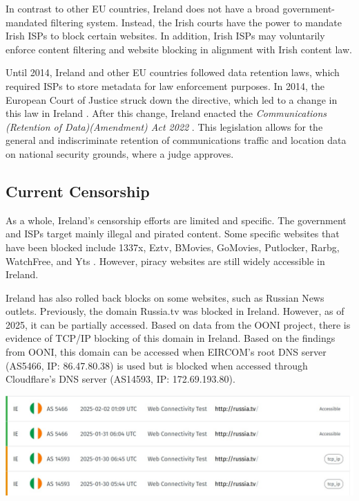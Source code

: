 In contrast to other EU countries, Ireland does not have a broad government-mandated filtering system. Instead, the Irish courts have the power to mandate Irish ISPs to block certain websites. In addition, Irish ISPs may voluntarily enforce content filtering and website blocking in alignment with Irish content law.

Until 2014, Ireland and other EU countries followed data retention laws, which required ISPs to store metadata for law enforcement purposes. In 2014, the European Court of Justice struck down the directive, which led to a change in this law in Ireland \cite{DataRetentionInvalid2014}. After this change, Ireland enacted the \textit{Communications (Retention of Data)(Amendment) Act 2022} \cite{irishlegalDataRetention}. This legislation allows for the general and indiscriminate retention of communications traffic and location data on national security grounds, where a judge approves.

\subsection{Current Censorship}

As a whole, Ireland's censorship efforts are limited and specific. The government and ISPs target mainly illegal and pirated content. Some specific websites that have been blocked include 1337x, Eztv, BMovies, GoMovies, Putlocker, Rarbg, WatchFree, and Yts \cite{siliconrepublicMovieIndustry}. However, piracy websites are still widely accessible in Ireland.

Ireland has also rolled back blocks on some websites, such as Russian News outlets. Previously, the domain Russia.tv was blocked in Ireland. However, as of 2025, it can be partially accessed. Based on data from the OONI project, there is evidence of TCP/IP blocking of this domain in Ireland. Based on the findings from OONI, this domain can be accessed when EIRCOM's root DNS server (AS5466, IP: 86.47.80.38) is used but is blocked when accessed through Cloudflare's DNS server (AS14593, IP: 172.69.193.80).

\centerline{\includegraphics[width=480pt]{Griff/TCD SCSS CAPSTONE/Literature Review/RussiaTV search OONI.jpg}}

